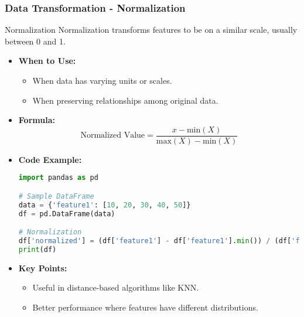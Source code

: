 \documentclass[aspectratio=169]{beamer}
\begin{document}
\begin{frame}[fragile]
    \frametitle{Data Transformation - Normalization}
    \begin{block}{Normalization}
        Normalization transforms features to be on a similar scale, usually between 0 and 1.
        \begin{itemize}
            \item \textbf{When to Use:}
                \begin{itemize}
                    \item When data has varying units or scales.
                    \item When preserving relationships among original data.
                \end{itemize}
            \item \textbf{Formula:}
            \begin{equation}
                \text{Normalized Value} = \frac{x - \text{min}(X)}{\text{max}(X) - \text{min}(X)}
            \end{equation}
            \item \textbf{Code Example:}
            \begin{lstlisting}[language=Python]
import pandas as pd

# Sample DataFrame
data = {'feature1': [10, 20, 30, 40, 50]}
df = pd.DataFrame(data)

# Normalization
df['normalized'] = (df['feature1'] - df['feature1'].min()) / (df['feature1'].max() - df['feature1'].min())
print(df)
            \end{lstlisting}
            \item \textbf{Key Points:}
                \begin{itemize}
                    \item Useful in distance-based algorithms like KNN.
                    \item Better performance where features have different distributions.
                \end{itemize}
        \end{itemize}
    \end{block}
\end{frame}
\end{document}
